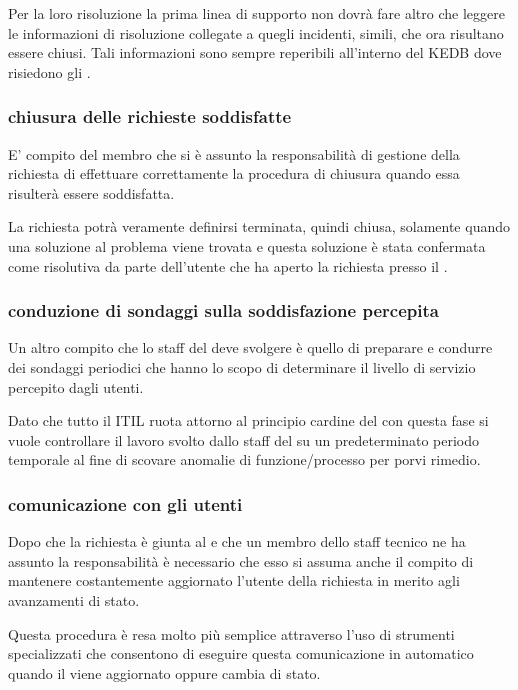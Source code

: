 Per la loro risoluzione la prima linea di supporto non dovrà fare altro che leggere le informazioni di risoluzione collegate a quegli incidenti, simili, che ora risultano essere chiusi. Tali informazioni sono sempre reperibili all'interno del \ac{KEDB} dove risiedono gli .

\subsubsection[Chiusura delle richieste soddisfatte]{chiusura delle richieste soddisfatte}
E' compito del membro che si è assunto la responsabilità di gestione della richiesta di effettuare correttamente la procedura di chiusura quando essa risulterà essere soddisfatta.

La richiesta potrà veramente definirsi terminata, quindi chiusa, solamente quando una soluzione al problema viene trovata e questa soluzione è stata confermata come risolutiva da parte dell'utente che ha aperto la richiesta presso il .

\subsubsection[Conduzione di sondaggi sulla soddisfazione percepita]{conduzione di sondaggi sulla soddisfazione percepita}
Un altro compito che lo staff del  deve svolgere è quello di preparare e condurre dei sondaggi periodici che hanno lo scopo di determinare il livello di servizio percepito dagli utenti.

Dato che tutto il  \ac{ITIL} ruota attorno al principio cardine del  con questa fase si vuole controllare il lavoro svolto dallo staff del  su un predeterminato periodo temporale al fine di scovare anomalie di funzione/processo per porvi rimedio.

\subsubsection[Comunicazione con gli utenti]{comunicazione con gli utenti}
Dopo che la richiesta è giunta al  e che un membro dello staff tecnico ne ha assunto la responsabilità è necessario che esso si assuma anche il compito di mantenere costantemente aggiornato l'utente della richiesta in merito agli avanzamenti di stato.

Questa procedura è resa molto più semplice attraverso l'uso di strumenti  specializzati che consentono di eseguire questa comunicazione in automatico quando il  viene aggiornato oppure cambia di stato.

